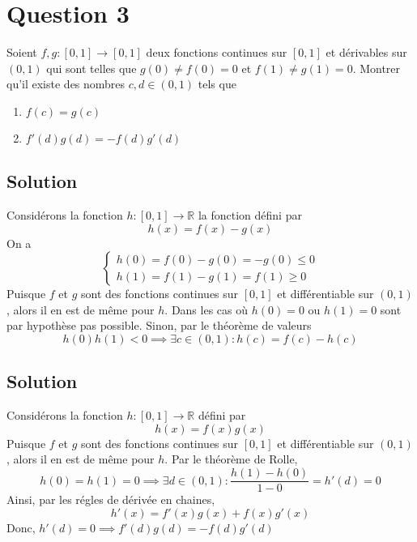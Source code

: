 \section*{Question 3}
	Soient $f,g :[0,1]\longrightarrow[0,1]$ deux fonctions continues sur $[0,1]$ et dérivables sur $(0,1)$ qui sont telles que $g(0)\neq f(0)=0$ et $f(1)\neq g(1)=0$. Montrer qu'il existe des nombres $c,d\in (0,1)$ tels que
	\begin{enumerate}[label=\alph*)]
		\item $f(c)=g(c)$
		\item $f'(d)g(d)=-f(d)g'(d)$
	\end{enumerate}
\subsection{Solution}
		Considérons la fonction $h:[0,1]\longrightarrow\mathbb{R}$ la fonction défini par \[h(x)=f(x)-g(x)\]
		On a \[\begin{cases}
		h(0)=f(0)-g(0)=-g(0)\leq 0\\
		h(1)=f(1)-g(1)=f(1)\geq 0
		\end{cases}\]
		Puisque $f$ et $g$ sont des fonctions continues sur $[0,1]$ et différentiable sur $(0,1)$, alors il en est de même pour $h$.
		Dans les cas où $h(0)=0$ ou $h(1)=0$ sont par hypothèse pas possible. Sinon, par le théorème de valeurs
		\[h(0)h(1)<0 \implies\exists c\in (0,1): h(c)= f(c)-h(c)\]
\subsection{Solution}
		Considérons la fonction $h:[0,1]\longrightarrow\mathbb{R}$ défini par \[h(x)=f(x)g(x)\]
		Puisque $f$ et $g$ sont des fonctions continues sur $[0,1]$ et différentiable sur $(0,1)$, alors il en est de même pour $h$. Par le théorème de Rolle, 
		\[h(0)=h(1)=0 \implies \exists d\in (0,1) : \frac{h(1)-h(0)}{1-0}=h'(d)=0\]
		Ainsi, par les régles de dérivée en chaines,
		\[h'(x)=f'(x)g(x)+f(x)g'(x)\]
		Donc, $h'(d)=0 \implies f'(d)g(d)=-f(d)g'(d)$